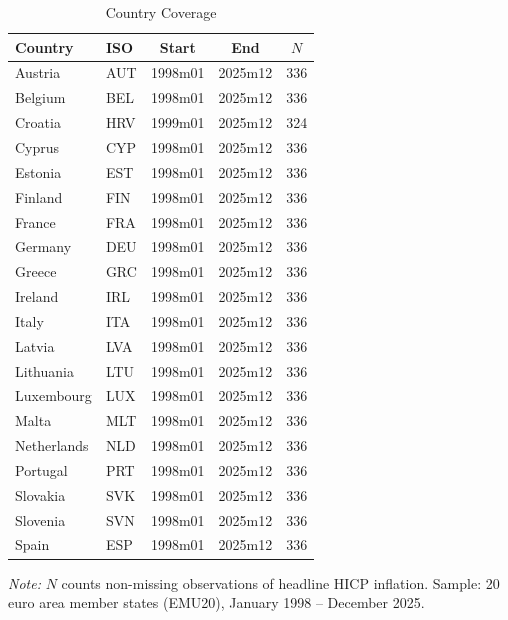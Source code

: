 \documentclass[a4paper,12pt]{article}
\begin{document}
\begin{table}[htbp]
  \centering
  \begin{threeparttable}
  \caption{Country Coverage}
  \label{tab:coverage}
  \footnotesize
  \begin{tabular*}{\textwidth}{@{\extracolsep{\fill}}llccc}
    \toprule
    Country & ISO & Start & End & $N$ \\
    \midrule
    Austria     & AUT & 1998m01 & 2025m12 & 336 \\
    Belgium     & BEL & 1998m01 & 2025m12 & 336 \\
    Croatia     & HRV & 1999m01 & 2025m12 & 324 \\
    Cyprus      & CYP & 1998m01 & 2025m12 & 336 \\
    Estonia     & EST & 1998m01 & 2025m12 & 336 \\
    Finland     & FIN & 1998m01 & 2025m12 & 336 \\
    France      & FRA & 1998m01 & 2025m12 & 336 \\
    Germany     & DEU & 1998m01 & 2025m12 & 336 \\
    Greece      & GRC & 1998m01 & 2025m12 & 336 \\
    Ireland     & IRL & 1998m01 & 2025m12 & 336 \\
    Italy       & ITA & 1998m01 & 2025m12 & 336 \\
    Latvia      & LVA & 1998m01 & 2025m12 & 336 \\
    Lithuania   & LTU & 1998m01 & 2025m12 & 336 \\
    Luxembourg  & LUX & 1998m01 & 2025m12 & 336 \\
    Malta       & MLT & 1998m01 & 2025m12 & 336 \\
    Netherlands & NLD & 1998m01 & 2025m12 & 336 \\
    Portugal    & PRT & 1998m01 & 2025m12 & 336 \\
    Slovakia    & SVK & 1998m01 & 2025m12 & 336 \\
    Slovenia    & SVN & 1998m01 & 2025m12 & 336 \\
    Spain       & ESP & 1998m01 & 2025m12 & 336 \\
    \bottomrule
  \end{tabular*}
  \begin{tablenotes}
    \footnotesize
    \item \textit{Note:} $N$ counts non-missing observations of headline HICP inflation. Sample: 20 euro area member states (EMU20), January 1998 -- December 2025.
  \end{tablenotes}
  \end{threeparttable}
\end{table}






\clearpage
\end{document}
